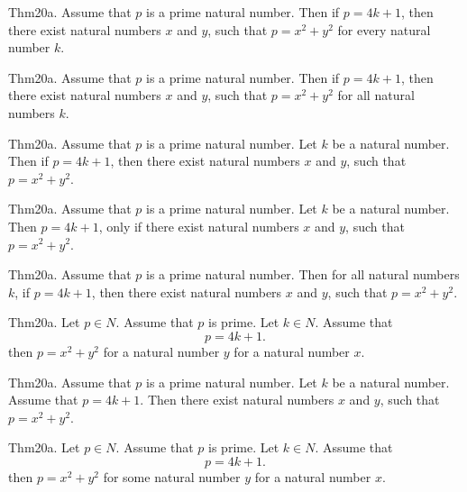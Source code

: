 \documentclass{article}
\begin{document}
Thm20a. Assume that $p$ is a prime natural number. Then if $p = 4 k + 1$, then there exist natural numbers $x$ and $y$, such that $p = x ^{ 2}+ y ^{ 2}$ for every natural number $k$.

Thm20a. Assume that $p$ is a prime natural number. Then if $p = 4 k + 1$, then there exist natural numbers $x$ and $y$, such that $p = x ^{ 2}+ y ^{ 2}$ for all natural numbers $k$.

Thm20a. Assume that $p$ is a prime natural number. Let $k$ be a natural number. Then if $p = 4 k + 1$, then there exist natural numbers $x$ and $y$, such that $p = x ^{ 2}+ y ^{ 2}$.

Thm20a. Assume that $p$ is a prime natural number. Let $k$ be a natural number. Then $p = 4 k + 1$, only if there exist natural numbers $x$ and $y$, such that $p = x ^{ 2}+ y ^{ 2}$.

Thm20a. Assume that $p$ is a prime natural number. Then for all natural numbers $k$, if $p = 4 k + 1$, then there exist natural numbers $x$ and $y$, such that $p = x ^{ 2}+ y ^{ 2}$.

Thm20a. Let $p \in N$. Assume that $p$ is prime. Let $k \in N$. Assume that $$p = 4 k + 1.$$ then $p = x ^{ 2}+ y ^{ 2}$ for a natural number $y$ for a natural number $x$.

Thm20a. Assume that $p$ is a prime natural number. Let $k$ be a natural number. Assume that $p = 4 k + 1$. Then there exist natural numbers $x$ and $y$, such that $p = x ^{ 2}+ y ^{ 2}$.

Thm20a. Let $p \in N$. Assume that $p$ is prime. Let $k \in N$. Assume that $$p = 4 k + 1.$$ then $p = x ^{ 2}+ y ^{ 2}$ for some natural number $y$ for a natural number $x$.
\end{document}
